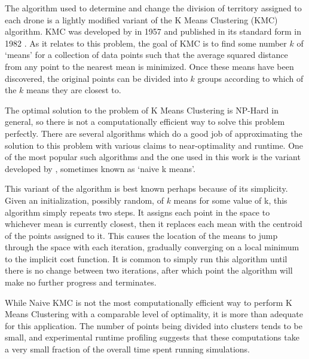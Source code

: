 The algorithm used to determine and change the division of territory assigned to each drone is a lightly modified variant of the K Means Clustering (KMC) algorithm. KMC was developed by \citeauthor{KMC} in 1957 and published in its standard form in 1982 \cite{KMC}. As it relates to this problem, the goal of KMC is to find some number $k$ of `means' for a collection of data points such that the average squared distance from any point to the nearest mean is minimized. Once these means have been discovered, the original points can be divided into $k$ groups according to which of the $k$ means they are closest to.

The optimal solution to the problem of K Means Clustering is NP-Hard in general, so there is not a computationally efficient way to solve this problem perfectly. There are several algorithms which do a good job of approximating the solution to this problem with various claims to near-optimality and runtime. One of the most popular such algorithms and the one used in this work is the variant developed by \citeauthor{KMC}, sometimes known as `naive k means'.

This variant of the algorithm is best known perhaps because of its simplicity. Given an initialization, possibly random, of $k$ means for some value of k, this algorithm simply repeats two steps. It assigns each point in the space to whichever mean is currently closest, then it replaces each mean with the centroid of the points assigned to it. This causes the location of the means to jump through the space with each iteration, gradually converging on a local minimum to the implicit cost function. It is common to simply run this algorithm until there is no change between two iterations, after which point the algorithm will make no further progress and terminates.

While Naive KMC is not the most computationally efficient way to perform K Means Clustering with a comparable level of optimality, it is more than adequate for this application. The number of points being divided into clusters tends to be small, and experimental runtime profiling suggests that these computations take a very small fraction of the overall time spent running simulations.

